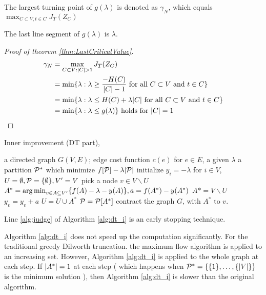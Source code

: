 \documentclass{article}
\begin{document}
\begin{theorem}\label{thm:LastCriticalValue}
The largest turning point of $g(\lambda)$ is denoted as $\gamma_N$, which equals $\max_{C\subset V, t\in C}J_T(Z_C)$
\end{theorem}

The last line segment of $g(\lambda)$ is $\lambda$.
\begin{proof}[Proof of theorem \ref{thm:LastCriticalValue}]
\begin{align*}
\gamma_N & = \max_{C\subset V: \abs{C}>1} J_T(Z_C) \\
& = \min\{\lambda : \lambda \geq \frac{-H(C)}{\abs{C}-1} \textrm{ for all $C\subset V$ and $ t\in C$}\} \\
& = \min\{\lambda : \lambda \leq H(C)+\lambda\abs{C} \textrm{ for all $C\subset V$ and $t \in C$}\} \\
& = \min\{\lambda : \lambda \leq g(\lambda) \} \textrm{ holds for } \abs{C}=1
\end{align*}
\end{proof}

Inner improvement (DT part),
\begin{algorithm}
\caption{}\label{alg:dt_i}
\begin{algorithmic}[1]
\REQUIRE a directed graph $G(V, E)$; edge cost function $c(e)$ for $e\in E$, a given $\lambda$
\ENSURE a partition $\P^*$ which minimize $f[\P] - \lambda \abs{\P}$
\STATE initialize $y_i = -\lambda$ for $ i \in V$, $U = \emptyset, \P = \{\emptyset\}, V' = V$
\STATE pick a node $v \in V\backslash U$
\STATE $A^* = \argmin_{v \in A \subseteq V'} \{ f(A) - \lambda - y(A)\}, a = f(A^*) - y(A^*)$
 \label{alg:judge}
\STATE $A* = V \backslash U$
\ENDIF
\STATE $y_v = y_v + a$
\STATE $U = U \cup A^*$
\STATE $\P= \P[A^*]$
\STATE contract the graph $G$, with $A^*$ to $v$.
\ENDWHILE
\end{algorithmic}
\end{algorithm}
Line \ref{alg:judge} of Algorithm \ref{alg:dt_i} is an early stopping technique.

Algorithm \ref{alg:dt_i} does not speed up the computation significantly. For the traditional greedy Dilworth truncation. the maximum flow algorithm is applied to an increasing set. However, Algorithm \ref{alg:dt_i} is applied to the whole graph at each step. If $\abs{A^*} = 1$ at each step ( which happens when $\P^* = \{\{1\},\dots, \{\abs{V}\}\}$ is the minimum solution ), then Algorithm \ref{alg:dt_i} is slower than the original algorithm.
\end{document}
